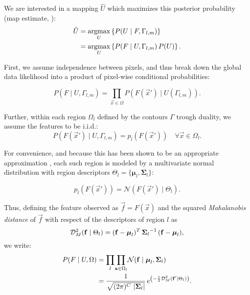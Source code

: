 We are interested in a mapping $\hat{U}$ which maximizes this
posterior probability (\gls*{map} estimate, \citep{bishop_pattern_2006}):
\begin{align}
\hat{U} &= \underset{U}{\argmax} \left\{ P(U \mid F,\Gamma_{l,m}) \right\} \notag\\
 &= \underset{U}{\argmax} \left\{ P(F \mid U,\Gamma_{l,m})\, P(U) \right\}.
\label{eq:map_u}
\end{align}

First, we assume independence between pixels, and thus break down the
global data likelihood into a product of pixel-wise conditional probabilities:

\begin{equation}
P(F \mid U,\Gamma_{l,m}) = 
\underset{\vec{x}\in \Omega}{\prod} P\left( F(\vec{x}') \mid U(\Gamma_{l,m}) \right).
\label{eq:bayes_aposteriori}
\end{equation}

Further, within each region $\Omega_l$ defined by the contours $\Gamma$
trough duality, we assume the features to be i.i.d.:
\begin{equation}
P\left( F(\vec{x}') \mid U,\Gamma_{l,m} \right) = p_l( F(\vec{x}')) \quad
\forall \vec{x} \in \Omega_l.
\label{eq:likelihood}
\end{equation}

For convenience, and because this has been shown to be an appropriate
approximation \citep{bishop_pattern_2006}, each such region is modeled
by a multivariate normal distribution with region descriptors
$\Theta_l = \lbrace \boldsymbol{\mu}_l, \boldsymbol{\Sigma}_{l} \rbrace$:

\begin{equation}
p_l( F(\vec{x}') ) = \mathcal{N} \left( F(\vec{x}') \mid \Theta_l \right).
\label{eq:multivariate_normal}
\end{equation}

Thus, defining the feature observed as $\vec{f}=F(\vec{x})$ and 
the squared \emph{Mahalanobis distance} of $\vec{f}$ with respect
of the descriptors of region $l$ as
\begin{equation}
\mathcal{D}_M^2(\mathbf{f} \mid \Theta_l) = (\mathbf{f} - \boldsymbol{\mu}_l)^T \, {\boldsymbol{\Sigma}_l}^{-1} \, (\mathbf{f} - \boldsymbol{\mu}_l),
\end{equation}
we write:
\begin{align}
P( F \mid U, \Omega ) &= \underset{l}{\prod} \underset{\vec{x} \in \Omega_l}{\prod}
\mathcal{N} ( \vec{f} \mid \boldsymbol{\mu}_l, \boldsymbol{\Sigma}_{l} ) \notag\\
&= \frac{1}{ \sqrt{(2\pi)^{C}\,\left|\boldsymbol{\Sigma}_{l}\right|}}\,{e^{\left(-\frac{1}{2}
\mdist{f'}{l} \right)}}.
\label{eq:pdf}
\end{align}

